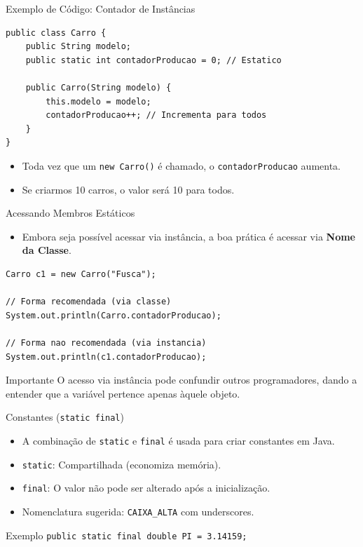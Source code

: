 \documentclass[9pt]{beamer}
\begin{document}
\begin{frame}[fragile]{Exemplo de Código: Contador de Instâncias}
\begin{lstlisting}
public class Carro {
    public String modelo;
    public static int contadorProducao = 0; // Estatico

    public Carro(String modelo) {
        this.modelo = modelo;
        contadorProducao++; // Incrementa para todos
    }
}
\end{lstlisting}
    \begin{itemize}
        \item Toda vez que um \texttt{new Carro()} é chamado, o \texttt{contadorProducao} aumenta.
        \item Se criarmos 10 carros, o valor será 10 para todos.
    \end{itemize}
\end{frame}

\begin{frame}[fragile]{Acessando Membros Estáticos}
    \begin{itemize}
        \item Embora seja possível acessar via instância, a boa prática é acessar via \textbf{Nome da Classe}.
    \end{itemize}
\begin{lstlisting}
Carro c1 = new Carro("Fusca");

// Forma recomendada (via classe)
System.out.println(Carro.contadorProducao);

// Forma nao recomendada (via instancia)
System.out.println(c1.contadorProducao); 
\end{lstlisting}
    \begin{alertblock}{Importante}
        O acesso via instância pode confundir outros programadores, dando a entender que a variável pertence apenas àquele objeto.
    \end{alertblock}
\end{frame}

\begin{frame}{Constantes (\texttt{static final})}
    \begin{itemize}
        \item A combinação de \texttt{static} e \texttt{final} é usada para criar constantes em Java.
        \item \texttt{static}: Compartilhada (economiza memória).
        \item \texttt{final}: O valor não pode ser alterado após a inicialização.
        \item Nomenclatura sugerida: \texttt{CAIXA\_ALTA} com underscores.
    \end{itemize}
    \begin{exampleblock}{Exemplo}
        \texttt{public static final double PI = 3.14159;}
    \end{exampleblock}
\end{frame}
\end{document}
